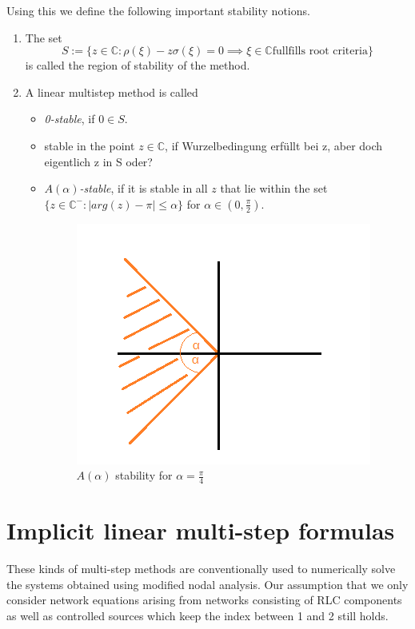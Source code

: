 	Using this we define the following important stability notions.
	\begin{definition}
		\begin{enumerate}
			\item 
			The set
			\begin{equation}
				S := \{z \in \mathbb{C} : \rho(\xi) - z \sigma(\xi) = 0 \implies \xi \in \mathbb{C} \text{fullfills root criteria}\}
			\end{equation}
			is called the region of stability of the method.
			\item 
			A linear multistep method is called
			\begin{itemize}
				\item \emph{0-stable}, if $0 \in S$.
				\item stable in the point $z \in \mathbb{C}$, if Wurzelbedingung erfüllt bei z, aber doch eigentlich z in S oder?
				\item \emph{$A(\alpha)$-stable}, if it is stable in all $z$ that lie within the set $\{z \in \mathbb{C}^- : |arg(z)-\pi| \leq \alpha\}$ for $\alpha \in (0, \frac{\pi}{2})$.
				 \begin{figure}[H]
				 	\centering
				 	\includegraphics[width=0.3\linewidth]{screenshot021}
				 	\caption{$A(\alpha)$ stability for $\alpha = \frac{\pi}{4}$}
				 	\label{fig:screenshot021}
				 \end{figure}
				 
			\end{itemize}
		\end{enumerate}
	\end{definition}
	

\section{Implicit linear multi-step formulas}
These kinds of multi-step methods are conventionally used to numerically solve the systems obtained using modified nodal analysis. Our assumption that we only consider network equations arising from networks consisting of RLC components as well as controlled sources which keep the index between 1 and 2 still holds.

